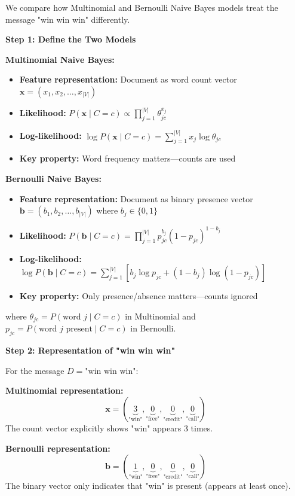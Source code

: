 \documentclass[12pt]{article}
\begin{document}
\begin{solution}
We compare how Multinomial and Bernoulli Naive Bayes models treat the message "win win win" differently.

\textbf{Step 1: Define the Two Models}

\textbf{Multinomial Naive Bayes:}
\begin{itemize}
    \item \textbf{Feature representation:} Document as word count vector $\mathbf{x} = (x_1, x_2, \ldots, x_{|V|})$
    \item \textbf{Likelihood:} $P(\mathbf{x} \mid C=c) \propto \prod_{j=1}^{|V|} \theta_{jc}^{x_j}$
    \item \textbf{Log-likelihood:} $\log P(\mathbf{x} \mid C=c) = \sum_{j=1}^{|V|} x_j \log \theta_{jc}$
    \item \textbf{Key property:} Word frequency matters—counts are used
\end{itemize}

\textbf{Bernoulli Naive Bayes:}
\begin{itemize}
    \item \textbf{Feature representation:} Document as binary presence vector $\mathbf{b} = (b_1, b_2, \ldots, b_{|V|})$ where $b_j \in \{0,1\}$
    \item \textbf{Likelihood:} $P(\mathbf{b} \mid C=c) = \prod_{j=1}^{|V|} p_{jc}^{b_j} (1-p_{jc})^{1-b_j}$
    \item \textbf{Log-likelihood:} $\log P(\mathbf{b} \mid C=c) = \sum_{j=1}^{|V|} \left[ b_j \log p_{jc} + (1-b_j) \log(1-p_{jc}) \right]$
    \item \textbf{Key property:} Only presence/absence matters—counts ignored
\end{itemize}

where $\theta_{jc} = P(\text{word } j \mid C=c)$ in Multinomial and $p_{jc} = P(\text{word } j \text{ present} \mid C=c)$ in Bernoulli.

\textbf{Step 2: Representation of "win win win"}

For the message $D = \text{"win win win"}$:

\textbf{Multinomial representation:}
\[
\mathbf{x} = (\underbrace{3}_{\text{"win"}}, \underbrace{0}_{\text{"free"}}, \underbrace{0}_{\text{"credit"}}, \underbrace{0}_{\text{"call"}})
\]
The count vector explicitly shows "win" appears 3 times.

\textbf{Bernoulli representation:}
\[
\mathbf{b} = (\underbrace{1}_{\text{"win"}}, \underbrace{0}_{\text{"free"}}, \underbrace{0}_{\text{"credit"}}, \underbrace{0}_{\text{"call"}})
\]
The binary vector only indicates that "win" is present (appears at least once).


\end{solution}
\end{document}
